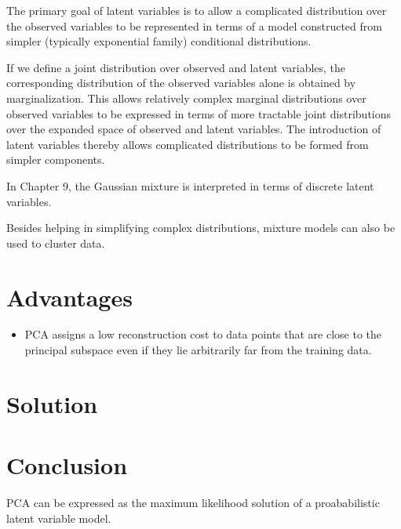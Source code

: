 The primary goal of latent variables is to allow a complicated distribution over the observed variables to be represented in terms of a model constructed from simpler (typically exponential family) conditional distributions.

If we define a joint distribution over observed and latent variables, the corresponding distribution of the observed variables alone is obtained by marginalization.  This allows relatively complex marginal distributions over observed variables to be expressed in terms of more tractable joint distributions over the expanded space of observed and latent variables.  The introduction of latent variables thereby allows complicated distributions to be formed from simpler components.  

In Chapter 9, the Gaussian mixture is interpreted in terms of discrete latent variables.  

Besides helping in	 simplifying complex distributions, mixture models can also be used to cluster data.
\section{Advantages}
\begin{itemize}
\item PCA assigns a low reconstruction cost to data points that are close to the principal subspace even if they lie arbitrarily far from the training data.
\end{itemize}

\section{Solution}


\section{Conclusion}
PCA can be expressed as the maximum likelihood solution of a proababilistic latent variable model.



